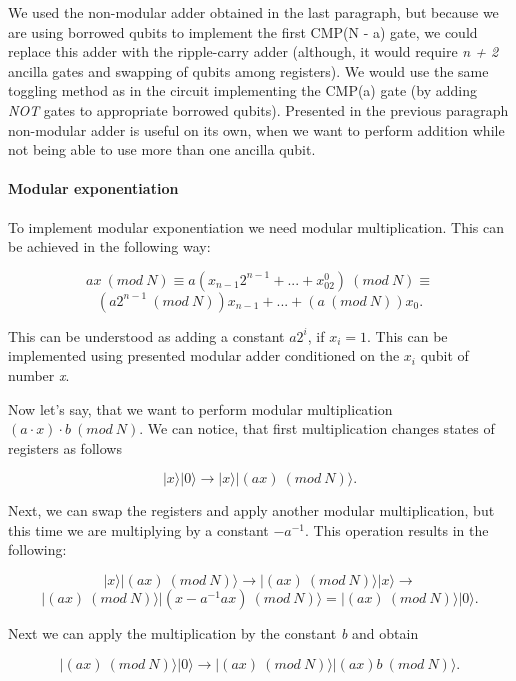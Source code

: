 \begin{remark}
We used the non-modular adder obtained in the last paragraph, but because we are using borrowed qubits to implement the first CMP(N - a) gate, we could replace this adder with the ripple-carry adder (although, it would require \textit{n + 2} ancilla gates and swapping of qubits among registers). We would use the same toggling method as in the circuit implementing the CMP(a) gate (by adding \textit{NOT} gates to appropriate borrowed qubits). Presented in the previous paragraph non-modular adder is useful on its own, when we want to perform addition while not being able to use more than one ancilla qubit. 
\end{remark}

\paragraph{Modular exponentiation \\}

To implement modular exponentiation we need modular multiplication. This can be achieved in the following way:

\[ ax\ (mod\ N) \equiv a(x_{n-1}2^{n-1} + ... + x_02^0)\ (mod\ N) \equiv \] \[ (a2^{n-1}\ (mod\ N))x_{n-1} + ... + (a\ (mod\ N))x_0.\]

This can be understood as adding a constant $a2^i$, if $x_i = 1$. This can be implemented using presented modular adder conditioned on the $x_i$ qubit of number \textit{x}. 

Now let's say, that we want to perform modular multiplication $(a\cdot x)\cdot b\ (mod\ N)$. We can notice, that first multiplication changes states of registers as follows

\[ |x\rangle |0\rangle \rightarrow |x\rangle |(ax)\ (mod\ N)\rangle.\]

Next, we can swap the registers and apply another modular multiplication, but this time we are multiplying by a constant $-a^{-1}$. This operation results in the following:

\[ |x\rangle |(ax)\ (mod\ N)\rangle \rightarrow |(ax)\ (mod\ N)\rangle |x\rangle \rightarrow \]
\[ |(ax)\ (mod\ N)\rangle |(x - a^{-1}ax)\ (mod\ N)\rangle = |(ax)\ (mod\ N)\rangle |0\rangle.\]

Next we can apply the multiplication by the constant \textit{b} and obtain

\[ |(ax)\ (mod\ N)\rangle |0\rangle \rightarrow |(ax)\ (mod\ N)\rangle |(ax)b\ (mod\ N)\rangle.\]

